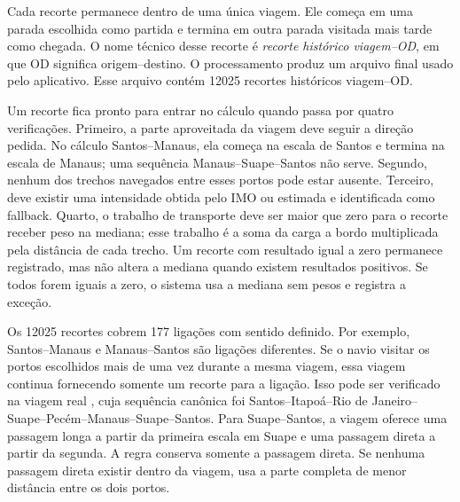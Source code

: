 Cada recorte permanece dentro de uma única viagem. Ele começa em uma parada escolhida como partida e termina em outra parada visitada mais tarde como chegada. O nome técnico desse recorte é \emph{recorte histórico viagem--OD}, em que OD significa origem--destino. O processamento produz um arquivo final usado pelo aplicativo. Esse arquivo contém \num{12025} recortes históricos viagem--OD.

Um recorte fica pronto para entrar no cálculo quando passa por quatro verificações. Primeiro, a parte aproveitada da viagem deve seguir a direção pedida. No cálculo Santos--Manaus, ela começa na escala de Santos e termina na escala de Manaus; uma sequência Manaus--Suape--Santos não serve. Segundo, nenhum dos trechos navegados entre esses portos pode estar ausente. Terceiro, deve existir uma intensidade obtida pelo IMO ou estimada e identificada como fallback. Quarto, o trabalho de transporte deve ser maior que zero para o recorte receber peso na mediana; esse trabalho é a soma da carga a bordo multiplicada pela distância de cada trecho. Um recorte com resultado igual a zero permanece registrado, mas não altera a mediana quando existem resultados positivos. Se todos forem iguais a zero, o sistema usa a mediana sem pesos e registra a exceção.

Os \num{12025} recortes cobrem \num{177} ligações com sentido definido. Por exemplo, Santos--Manaus e Manaus--Santos são ligações diferentes. Se o navio visitar os portos escolhidos mais de uma vez durante a mesma viagem, essa viagem continua fornecendo somente um recorte para a ligação. Isso pode ser verificado na viagem real , cuja sequência canônica foi Santos--Itapoá--Rio de Janeiro--Suape--Pecém--Manaus--Suape--Santos. Para Suape--Santos, a viagem oferece uma passagem longa a partir da primeira escala em Suape e uma passagem direta a partir da segunda. A regra conserva somente a passagem direta. Se nenhuma passagem direta existir dentro da viagem, usa a parte completa de menor distância entre os dois portos.

